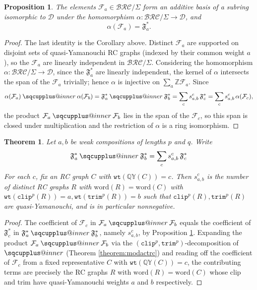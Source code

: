 \documentclass[a4paper,fleqn]{cas-sc}
\makeatletter
\newcommand{\sqcupplus@inner}[2]{%
  \vcenter{\hbox{\ooalign{%
    \hfil$\m@th#1\sqcup$\hfil\cr
    \hfil\raisebox{0.15ex}{$\m@th#1\scriptscriptstyle+$}\hfil\cr
  }}}%
}
\newcommand{\sqcupplus}{\mathbin{\mathpalette\sqcupplus@inner\relax}}
\newtheorem{proposition}[lemma]{Proposition}
\newtheorem{theorem}{Theorem}[section]
\theoremstyle{definition}
\theoremstyle{remark}
\numberwithin{equation}{subsection}
\newcommand{\wtt}{\mathtt{wt}}
\newcommand{\QY}{\ensuremath{\mathbb{QY}}}
\newcommand{\trm}{\mathtt{trim}}
\newcommand{\clp}{\mathtt{clip}}
\newcommand{\BRC}{\mathcal{BRC}}
\newcommand{\dcoma}{\mathcal{D}}
\makeatother
\begin{document}
\begin{proposition}\label{proposition:slidebasis}
The elements $\mathcal{F}_a\in\BRC/\Sigma$ form an additive basis of a subring isomorphic to $\dcoma$ under the homomorphism $\alpha:\BRC/\Sigma\to\dcoma$, and
$$\alpha(\mathcal{F}_a)=\mathfrak{F}_a^*.$$
\end{proposition}
\begin{proof}
The last identity is the Corollary above. Distinct $\mathcal{F}_a$ are supported on disjoint sets of quasi-Yamanouchi RC graphs (indexed by their common weight $a$), so the $\mathcal{F}_a$ are linearly independent in $\BRC/\Sigma$. Considering the homomorphism $\alpha:\BRC/\Sigma\to\dcoma$, since the $\mathfrak{F}_a^*$ are linearly independent, the kernel of $\alpha$ intersects the span of the $\mathcal{F}_a$ trivially; hence $\alpha$ is injective on $\sum_a \mathbb{Z}\mathcal{F}_a$. Since
$$\alpha(\mathcal{F}_a)\sqcupplus\alpha(\mathcal{F}_b)=\mathfrak{F}_a^*\sqcupplus\mathfrak{F}_b^*=\sum_c s_{a,b}^c\,\mathfrak{F}_c^*=\sum_c s_{a,b}^c\,\alpha(\mathcal{F}_c),$$
the product $\mathcal{F}_a\sqcupplus\mathcal{F}_b$ lies in the span of the $\mathcal{F}_c$, so this span is closed under multiplication and the restriction of $\alpha$ is a ring isomorphism.
\end{proof}

\begin{theorem} \label{theorem:lrfslide}
  Let $a,b$ be weak compositions of lengths $p$ and $q$. Write
$$\mathfrak{F}_a^*\sqcupplus\mathfrak{F}_b^*=\sum_c s_{a,b}^c\,\mathfrak{F}_c^*$$
For each $c$, fix an RC graph $C$ with $\wtt(\QY(C)) = c$. Then $s_{a,b}^c$ is the number of distinct RC graphs $R$ with $\mathrm{word}(R)=\mathrm{word}(C)$ with $\wtt(\clp^p(R)) = a,\wtt(\trm^p(R)) = b$ such that $\clp^p(R),\trm^p(R)$ are quasi-Yamanouchi, and is in particular nonnegative.
\end{theorem}
\begin{proof}
The coefficient of $\mathcal{F}_c$ in $\mathcal{F}_a\sqcupplus\mathcal{F}_b$ equals the coefficient of $\mathfrak{F}_c^*$ in $\mathfrak{F}_a^*\sqcupplus\mathfrak{F}_b^*$, namely $s_{a,b}^c$, by Proposition \ref{proposition:slidebasis}. Expanding the product $\mathcal{F}_a\sqcupplus\mathcal{F}_b$ via the $(\clp^p,\trm^p)$-decomposition of $\sqcupplus$ (Theorem \ref{theorem:modactrc}) and reading off the coefficient of $\mathcal{F}_c$ from a fixed representative $C$ with $\wtt(\QY(C))=c$, the contributing terms are precisely the RC graphs $R$ with $\mathrm{word}(R)=\mathrm{word}(C)$ whose clip and trim have quasi-Yamanouchi weights $a$ and $b$ respectively.
\end{proof}
\end{document}
